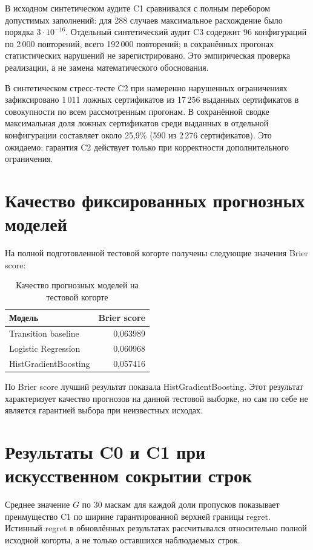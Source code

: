 \documentclass[12pt,a4paper]{article}
\begin{document}
В исходном синтетическом аудите C1 сравнивался с полным перебором допустимых заполнений: для 288 случаев максимальное расхождение было порядка $3\cdot10^{-16}$. Отдельный синтетический аудит C3 содержит 96 конфигураций по 2\,000 повторений, всего 192\,000 повторений; в сохранённых прогонах статистических нарушений не зарегистрировано. Это эмпирическая проверка реализации, а не замена математического обоснования.

В синтетическом стресс-тесте C2 при намеренно нарушенных ограничениях зафиксировано 1\,011 ложных сертификатов из 17\,256 выданных сертификатов в совокупности по всем рассмотренным прогонам. В сохранённой сводке максимальная доля ложных сертификатов среди выданных в отдельной конфигурации составляет около 25,9\% (590 из 2\,276 сертификатов). Это ожидаемо: гарантия C2 действует только при корректности дополнительного ограничения.

\section{Качество фиксированных прогнозных моделей}
На полной подготовленной тестовой когорте получены следующие значения Brier score:

\begin{table}[H]
\centering
\begin{tabular}{lr}
\toprule
Модель & Brier score\\
\midrule
Transition baseline & 0,063989\\
Logistic Regression & 0,060968\\
HistGradientBoosting & 0,057416\\
\bottomrule
\end{tabular}
\caption{Качество прогнозных моделей на тестовой когорте}
\end{table}

По Brier score лучший результат показала HistGradientBoosting. Этот результат характеризует качество прогнозов на данной тестовой выборке, но сам по себе не является гарантией выбора при неизвестных исходах.

\section{Результаты C0 и C1 при искусственном сокрытии строк}
Среднее значение $G$ по 30 маскам для каждой доли пропусков показывает преимущество C1 по ширине гарантированной верхней границы regret. Истинный regret в обновлённых результатах рассчитывался относительно полной исходной когорты, а не только оставшихся наблюдаемых строк.
\end{document}
